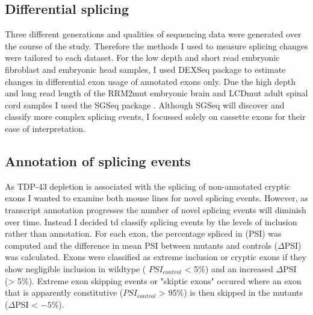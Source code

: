\subsection{Differential splicing}
Three different generations and qualities of sequencing data were generated over the course of the study.  Therefore the methods I  used  to  measure  splicing  changes  were  tailored to each dataset. 
For the low depth and short read embryonic fibroblast and  embryonic head samples, I used DEXSeq package \citep{Anders2012} to estimate changes in differential exon usage of annotated exons only.
Due the high depth and long read length of the RRM2mut embryonic brain and LCDmut adult spinal cord samples I used the SGSeq package \citep{Goldstein2016}.
Although SGSeq will discover and classify more complex splicing events, I focussed solely on cassette exons for their ease of interpretation.

\subsection{Annotation of splicing events}

As TDP-43 depletion is associated with the splicing of non-annotated cryptic exons \citep{Ling2015} I wanted to examine both mouse lines for  novel splicing events.
However, as transcript annotation progresses the number of novel splicing events will diminish over time. 
Instead  I decided td classify splicing events by the levels of inclusion rather than annotation. 
For each exon, the percentage spliced in (PSI) was computed and the difference in mean PSI between mutants and controls ($\Delta$PSI) was calculated.
Exons were classified as extreme inclusion or cryptic exons if they show negligible inclusion in wildtype ( $PSI_{control}$ < 5\%) and an increased $\Delta$PSI (> 5\%).
Extreme exon skipping events or "skiptic exons" occured where an exon that is apparently constitutive ($PSI_{control}$ > 95\%) is then skipped in the mutants ($\Delta$PSI < $-5$\%).

